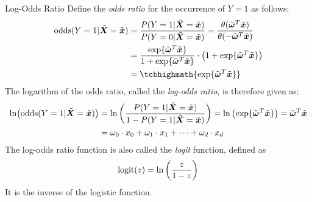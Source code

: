 %
%
%
%
\begin{frame}{Log-Odds Ratio}
%
Define the {\em odds ratio} for the occurrence of $Y=1$ as follows:
\begin{align*}
    \odds(Y=1|\abX=\abx) & = \frac{P(Y=1|\abX=\abx)}{P(Y=0|\abX=\abx)}
    = \frac{\theta(\trueabw^T\abx)}{\theta(-\trueabw^T\abx)}\notag\\
    & =  \frac{\exp\{\trueabw^T\abx\}}{1 + \exp\{\trueabw^T\abx\}} \cdot
    \bigl(1+\exp\{\trueabw^T\abx\}\bigr)\notag\\
    & = \tcbhighmath{\exp\{\trueabw^T\abx\}}
\end{align*}
The logarithm of the odds ratio, called the {\em log-odds ratio}, is
therefore given as:
\begin{align*}
    \ln\bigl(\operatorname{odds}(Y=1|\tilde{{\boldsymbol X}}=\tilde{{\boldsymbol x}})\bigr) & = \ln
    \left(\frac{P(Y=1|\tilde{{\boldsymbol X}}=\tilde{{\boldsymbol x}})}{1-P(Y=1|\tilde{{\boldsymbol X}}=\tilde{{\boldsymbol x}})}\right) \notag   = \ln
    \left(\exp\{\tilde{{\bm \omega}}^T\tilde{{\boldsymbol x}}\}\right) 
    = \tilde{{\bm \omega}}^T\tilde{{\boldsymbol x}}\notag\\
    & = \omega_0 \cdot x_0 + \omega_1 \cdot x_1 + \cdots + \omega_d
    \cdot x_d
\end{align*}
The log-odds ratio function is also called the {\em
logit} function, defined as 
\begin{align*}    
    \text{logit}(z) = \ln\left(\frac{z}{1-z}\right)
\end{align*}
It is the inverse of the logistic function.
\end{frame}

